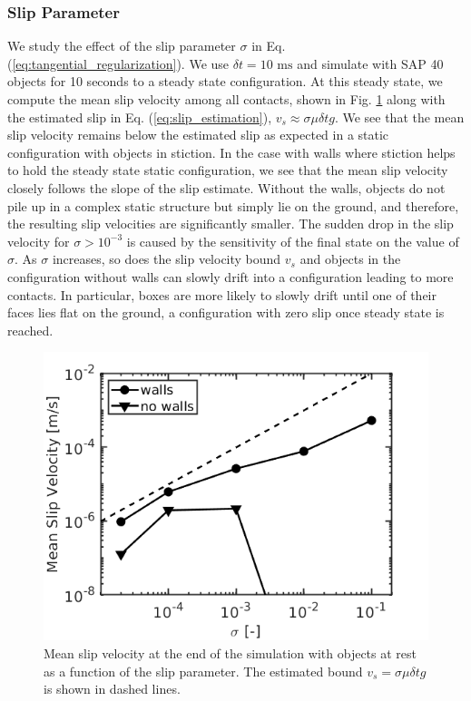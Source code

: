 \subsubsection{Slip Parameter}
We study the effect of the slip parameter $\sigma$ in Eq.
(\ref{eq:tangential_regularization}). We use $\delta t = 10\text{ ms}$ and
simulate with SAP 40 objects for 10 seconds to a steady state configuration. At
this steady state, we compute the mean slip velocity among all contacts, shown
in Fig. \ref{fig:clutter_sigma_vt} along with the estimated slip in Eq.
(\ref{eq:slip_estimation}), $v_s \approx\sigma\mu\delta t g$. We see that the
mean slip velocity remains below the estimated slip as expected in a static
configuration with objects in stiction. In the case with walls where stiction
helps to hold the steady state static configuration, we see that the mean slip
velocity closely follows the slope of the slip estimate. Without the walls,
objects do not pile up in a complex static structure but simply lie on the
ground, and therefore, the resulting slip velocities are significantly smaller.
The sudden drop in the slip velocity for $\sigma>10^{-3}$ is caused by the
sensitivity of the final state on the value of $\sigma$. As $\sigma$ increases,
so does the slip velocity bound $v_s$ and objects in the configuration without
walls can slowly drift into a configuration leading to more contacts. In
particular, boxes are more likely to slowly drift until one of their faces lies
flat on the ground, a configuration with zero slip once steady state is reached.
\begin{figure}[!h]
	\centering
	\includegraphics[width=0.7\columnwidth]{figures/clutter/sigma_vt.png}
	\caption{\label{fig:clutter_sigma_vt} 
	Mean slip velocity at the end of the simulation with objects at rest as a
	function of the slip parameter. The estimated bound $v_s = \sigma\mu\delta t
	g$ is shown in dashed lines.}
\end{figure}

